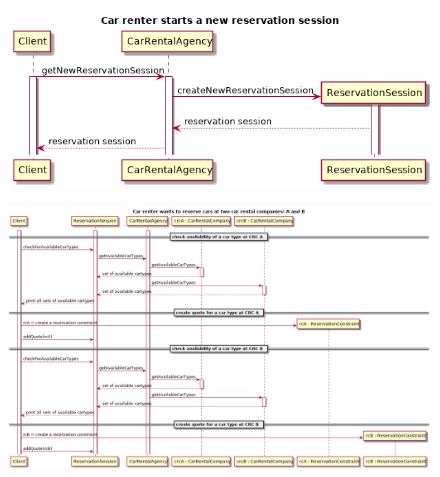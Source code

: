 \documentclass{ds-report}
\begin{document}
	\clearpage
	
	
	\begin{landscape}
		\begin{figure}
			\label{startSession}
			\centering
			\includegraphics[width=\paperwidth]{../diagrams/sequenceDiagrams/startSession.png}
		\end{figure}
	\end{landscape}
	
\clearpage
	\begin{landscape}
		\begin{figure}
			\label{reserveCars}
			\centering
			\includegraphics[width=\paperwidth]{../diagrams/sequenceDiagrams/reserveCars.png}
		\end{figure}
	\end{landscape}
	
\end{document}
